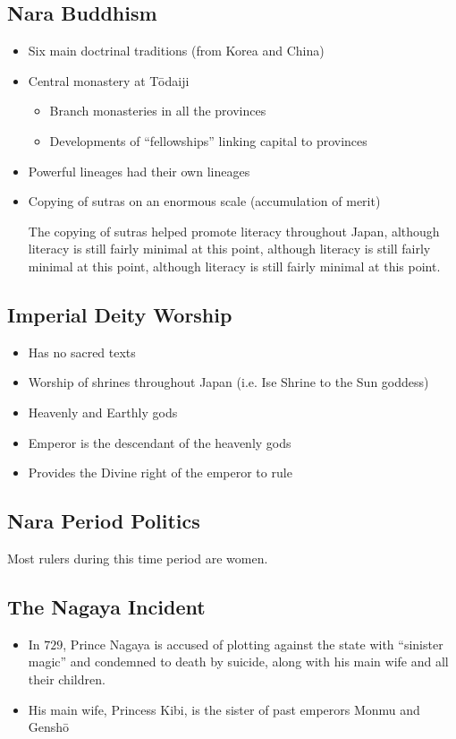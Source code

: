 \documentclass[class=article, crop=false]{standalone}
\begin{document}
  \subsection{Nara Buddhism}
  \begin{itemize}
    \item Six main doctrinal traditions (from Korea and China)
    \item Central monastery at T\=odaiji
    \begin{itemize}
      \item Branch monasteries in all the provinces
      \item Developments of ``fellowships'' linking capital to provinces
    \end{itemize}
    \item Powerful lineages had their own lineages
    \item Copying of sutras on an enormous scale (accumulation of merit)
    \begin{note}{}
      The copying of sutras helped promote literacy throughout Japan, although literacy is still fairly minimal at this point, although literacy is still fairly minimal at this point, although literacy is still fairly minimal at this point.
    \end{note}
  \end{itemize}
  \subsection{Imperial Deity Worship}
  \begin{itemize}
    \item Has no sacred texts
    \item Worship of shrines throughout Japan (i.e. Ise Shrine to the Sun goddess)
    \item Heavenly and Earthly gods
    \item Emperor is the descendant of the heavenly gods
    \item Provides the Divine right of the emperor to rule
  \end{itemize}
  \subsection{Nara Period Politics}
  Most rulers during this time period are women.
  \subsection{The Nagaya Incident}
  \begin{itemize}
    \item In $729$, Prince Nagaya is accused of plotting against the state with ``sinister magic'' and condemned to death by suicide, along with his main wife and all their children.
    \item His main wife, Princess Kibi, is the sister of past emperors Monmu and Gensh\=o
  \end{itemize}
\end{document}
